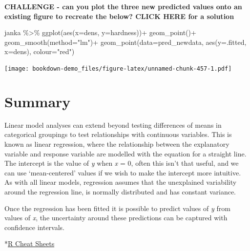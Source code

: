 \documentclass[
]{book}
\newenvironment{Shaded}{\begin{snugshade}}{\end{snugshade}}
\newcommand{\AttributeTok}[1]{\textcolor[rgb]{0.77,0.63,0.00}{#1}}
\newcommand{\FunctionTok}[1]{\textcolor[rgb]{0.00,0.00,0.00}{#1}}
\newcommand{\NormalTok}[1]{#1}
\newcommand{\SpecialCharTok}[1]{\textcolor[rgb]{0.00,0.00,0.00}{#1}}
\newcommand{\StringTok}[1]{\textcolor[rgb]{0.31,0.60,0.02}{#1}}
\begin{document}
\textbf{CHALLENGE - can you plot the three new predicted values onto an existing figure to recreate the below? CLICK HERE for a solution}

\begin{Shaded}
\begin{Highlighting}[]
\NormalTok{janka }\SpecialCharTok{\%\textgreater{}\%} 
  \FunctionTok{ggplot}\NormalTok{(}\FunctionTok{aes}\NormalTok{(}\AttributeTok{x=}\NormalTok{dens, }\AttributeTok{y=}\NormalTok{hardness))}\SpecialCharTok{+}
  \FunctionTok{geom\_point}\NormalTok{()}\SpecialCharTok{+}
  \FunctionTok{geom\_smooth}\NormalTok{(}\AttributeTok{method=}\StringTok{"lm"}\NormalTok{)}\SpecialCharTok{+}
  \FunctionTok{geom\_point}\NormalTok{(}\AttributeTok{data=}\NormalTok{pred\_newdata, }\FunctionTok{aes}\NormalTok{(}\AttributeTok{y=}\NormalTok{.fitted, }\AttributeTok{x=}\NormalTok{dens), }\AttributeTok{colour=}\StringTok{"red"}\NormalTok{)}
\end{Highlighting}
\end{Shaded}

\texttt{[image: bookdown-demo\_files/figure-latex/unnamed-chunk-457-1.pdf]}

\hypertarget{summary-5}{%
\section{Summary}\label{summary-5}}

Linear model analyses can extend beyond testing differences of means in categorical groupings to test relationships with continuous variables. This is known as linear regression, where the relationship between the explanatory variable and response variable are modelled with the equation for a straight line. The intercept is the value of \emph{y} when \emph{x} = 0, often this isn't that useful, and we can use `mean-centered' values if we wish to make the intercept more intuitive.
As with all linear models, regression assumes that the unexplained variability around the regression line, is normally distributed and has constant variance.

Once the regression has been fitted it is possible to predict values of \emph{y} from values of \emph{x}, the uncertainty around these predictions can be captured with confidence intervals.

*\href{https://www.rstudio.com/resources/cheatsheets/}{R Cheat Sheets}

  
\end{document}
